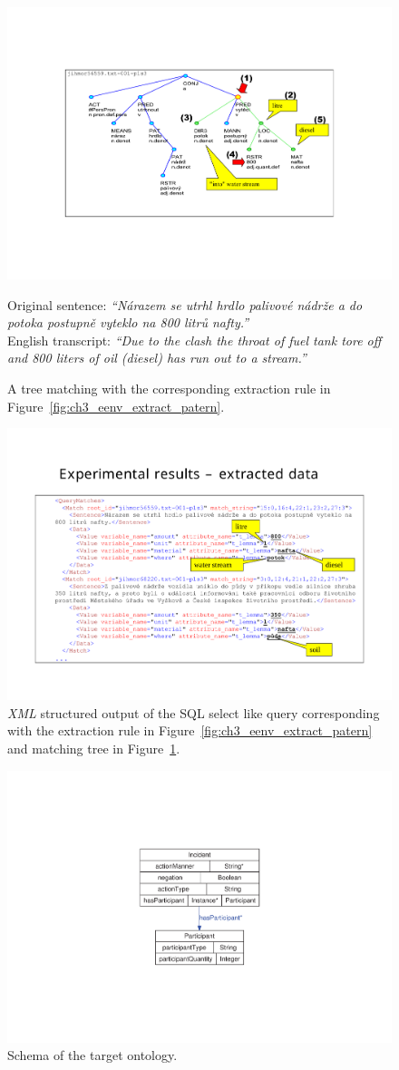 \begin{figure}
	\centering
		\includegraphics[angle=-90, width=0.6\hsize]{../img/ch3_eenv_matching_tree}
		
Original sentence: 
\emph{``Nárazem se utrhl hrdlo palivové nádrže a do potoka postupně vyteklo na 800 litrů nafty.''}\\
English transcript: 
\emph{``Due to the clash the throat of fuel tank tore off and 800 liters of oil (diesel) has run out to a stream.''}
	\caption{A tree matching with the corresponding extraction rule in Figure~\ref{fig:ch3_eenv_extract_patern}.}
	\label{fig:ch3_eenv_matching_tree}
\end{figure}


\begin{figure}
	\centering
		\includegraphics[angle=-90, width=0.7\hsize]{../img/ch3_eenv_results}
	\caption{\emph{XML} structured output of the SQL select like query corresponding with the extraction rule in Figure~\ref{fig:ch3_eenv_extract_patern} and matching tree in Figure~\ref{fig:ch3_eenv_matching_tree}.}
	\label{fig:ch3_eenv_results}
\end{figure}



\begin{figure}
	\centering
		\includegraphics[angle=-90, width=0.3\hsize]{../img/ch3_classes}
	\caption{Schema of the target ontology.}
	\label{fig:ch3_classes}
\end{figure}


